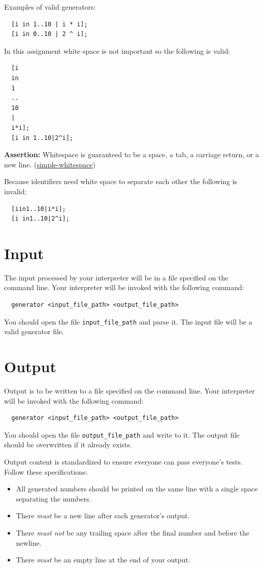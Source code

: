 \documentclass{article}
\newcommand{\code}[1]{\texttt{\textmd{#1}}}
\newcommand{\assertion}[2]{\textbf{Assertion: }#1 (\hyperlink{#2}{#2})}
\begin{document}
Examples of valid generators:
\begin{lstlisting}
  [i in 1..10 | i * i];
  [i in 0..10 | 2 ^ i];
\end{lstlisting}

In this assignment white space is not important so the following is valid:

\begin{lstlisting}
  [i
  in
  1
  ..
  10
  |
  i*i];
  [i in 1..10|2^i];
\end{lstlisting}

\assertion{Whitespace is guaranteed to be a space, a tab, a carriage return, or a new
line.}{simple-whitespace}

Because identifiers need white space to separate each other the following is invalid:
\begin{lstlisting}
  [iin1..10|i*i];
  [i in1..10|2^i];
\end{lstlisting}

\section{Input}
The input processed by your interpreter will be in a file specified on the command line. Your
interpreter will be invoked with the following command:
\begin{lstlisting}
  generator <input_file_path> <output_file_path>
\end{lstlisting}
You should open the file \code{input\_file\_path} and parse it. The input file will be a valid
generator file.

\section{Output}
Output is to be written to a file specified on the command line. Your interpreter will be invoked
with the following command:
\begin{lstlisting}
  generator <input_file_path> <output_file_path>
\end{lstlisting}
You should open the file \code{output\_file\_path} and write to it. The output file should be
overwritten if it already exists.

Output content is standardized to ensure everyone can pass everyone's tests. Follow these
specifications:
\begin{itemize}
  \item
    All generated numbers should be printed on the same line with a single space separating the
    numbers.
  \item
    There \textit{must} be a new line after each generator's output.
  \item
    There \textit{must not} be any trailing space after the final number and before the newline.
  \item
    There \textit{must} be an empty line at the end of your output.
\end{itemize}
\end{document}
